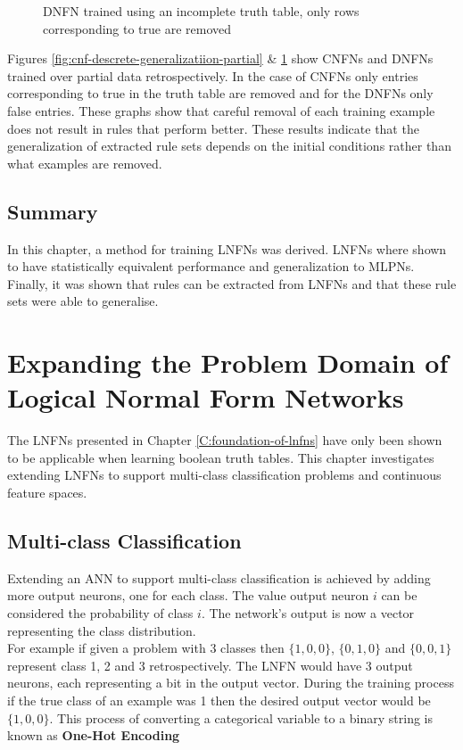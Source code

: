 \begin{figure}[H]
\begin{minipage}[b]{0.45\textwidth}
		\caption{DNFN trained using an incomplete truth table, only rows corresponding to true are removed}
		\label{fig:dnf-descrete-generalizatiion-partial}
	\end{minipage}
	\hfill
\end{figure}

Figures \ref{fig:cnf-descrete-generalizatiion-partial} \& \ref{fig:dnf-descrete-generalizatiion-partial} show CNFNs and DNFNs trained over partial data retrospectively. In the case of CNFNs only entries corresponding to true in the truth table are removed and for the DNFNs only false entries. These graphs show that careful removal of each training example does not result in rules that perform better. These results indicate that the generalization of extracted rule sets depends on the initial conditions rather than what examples are removed.

\section{Summary}
In this chapter, a method for training LNFNs was derived. LNFNs where shown to have statistically equivalent performance and generalization to MLPNs. Finally, it was shown that rules can be extracted from LNFNs and that these rule sets were able to generalise.

\chapter{Expanding the Problem Domain of Logical Normal Form Networks} \label{C:investigation-of-lnfns}
The LNFNs presented in Chapter \ref{C:foundation-of-lnfns} have only been shown to be applicable when learning boolean truth tables. This chapter investigates extending LNFNs to support multi-class classification problems and continuous feature spaces.

\section{Multi-class Classification}
Extending an ANN to support multi-class classification is achieved by adding more output neurons, one for each class. The value output neuron $i$ can be considered the probability of class $i$. The network's output is now a vector representing the class distribution. \\

For example if given a problem with 3 classes then $\{1,0,0\}$, $\{0,1,0\}$ and $\{0,0,1\}$ represent class 1, 2 and 3 retrospectively. The LNFN would have 3 output neurons, each representing a bit in the output vector. During the training process if the true class of an example was 1 then the desired output vector would be $\{1,0,0\}$. This process of converting a categorical variable to a binary string is known as \textbf{One-Hot Encoding}

